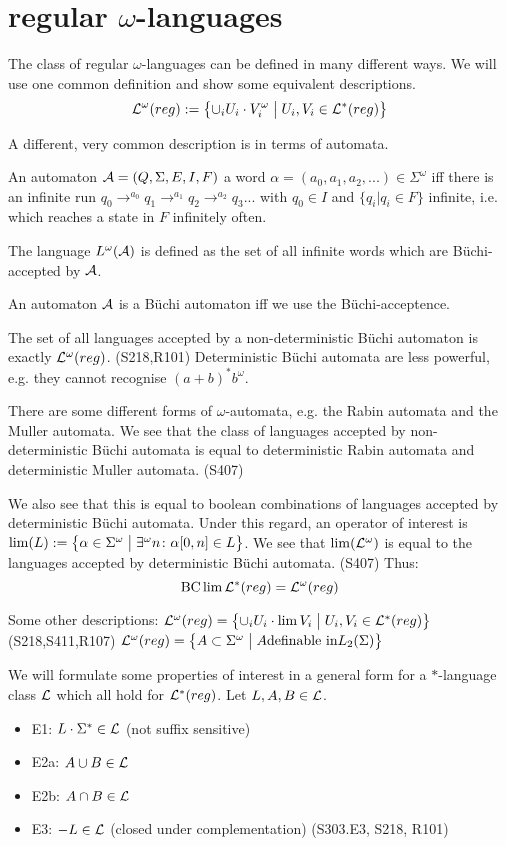 \section{regular $\omega$-languages}

The class of regular $\omega$-languages can be defined in many different ways. We will use one common definition and show some equivalent descriptions.
\[ \Lang^\omega(reg) := \Set{ \cup_i U_i \cdot V_i^\omega }{ U_i, V_i \in \Lang^*(reg) } \]

A different, very common description is in terms of automata.

An automaton $\mathcal{A} = (Q, \Sigma, E, I, F)$  a word $\alpha = (a_0,a_1,a_2,...) \in \Sigma^\omega$ iff there is an infinite run $q_0 \rightarrow^{a_0} q_1 \rightarrow^{a_1} q_2 \rightarrow^{a_2} q_3 ...$ with $q_0 \in I$ and $\{ q_i | q_i \in F \}$ infinite, i.e. which reaches a state in $F$ infinitely often.

The language $L^\omega(\mathcal{A})$ is defined as the set of all infinite words which are Büchi-accepted by  $\mathcal{A}$.

An automaton $\mathcal{A}$ is a Büchi automaton iff we use the Büchi-acceptence.

The set of all languages accepted by a non-deterministic Büchi automaton is exactly $\mathcal{L}^\omega(reg)$. (S218,R101) Deterministic Büchi automata are less powerful, e.g. they cannot recognise $(a+b)^* b^\omega$.

There are some different forms of $\omega$-automata, e.g. the Rabin automata and the Muller automata. We see that the class of languages accepted by non-deterministic Büchi automata is equal to deterministic Rabin automata and deterministic Muller automata. (S407)

We also see that this is equal to boolean combinations of languages accepted by deterministic Büchi automata. Under this regard, an operator of interest is $\lim(L) := \Set{ \alpha \in \Sigma^\omega }{ \exists^\omega n \colon \alpha[0,n] \in L }$. We see that $\lim(\mathcal{L}^\omega)$ is equal to the languages accepted by deterministic Büchi automata. (S407) Thus:
\[  \operatorname{BC} \lim \mathcal{L}^*(reg) = \mathcal{L}^\omega(reg) \]

Some other descriptions:
$\Lang^\omega(reg) = \Set{ \cup_i U_i \cdot \lim V_i }{ U_i, V_i \in \Lang^*(reg) }$ (S218,S411,R107)
$\Lang^\omega(reg) = \Set{A \subset \Sigma^\omega}{A \text{definable in} L_2(\Sigma)}$

We will formulate some properties of interest in a general form for a $*$-language class $\mathcal{L}$ which all hold for $\mathcal{L}^*(reg)$. Let $L,A,B \in \mathcal{L}$.
\begin{itemize}
\item E1: $L \cdot \Sigma^* \in \mathcal{L}$ (not suffix sensitive)
\item E2a: $A \cup B \in \mathcal{L}$
\item E2b: $A \cap B \in \mathcal{L}$
\item E3: $- L \in \mathcal{L}$ (closed under complementation) (S303.E3, S218, R101)
\end{itemize}
